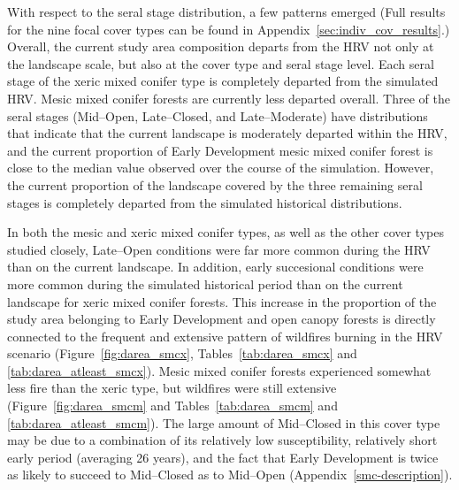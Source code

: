 With respect to the seral stage distribution, a few patterns emerged (Full results for the nine focal cover types can be found in Appendix~\ref{sec:indiv_cov_results}.) Overall, the current study area composition departs from the HRV not only at the landscape scale, but also at the cover type and seral stage level. Each seral stage of the xeric mixed conifer type is completely departed from the simulated HRV. Mesic mixed conifer forests are currently less departed overall. Three of the seral stages (Mid--Open, Late--Closed, and Late--Moderate) have distributions that indicate that the current landscape is moderately departed within the HRV, and the current proportion of Early Development mesic mixed conifer forest is close to the median value observed over the course of the simulation. However, the current proportion of the landscape covered by the three remaining seral stages is completely departed from the simulated historical distributions.

In both the mesic and xeric mixed conifer types, as well as the other cover types studied closely, Late--Open conditions were far more common during the HRV than on the current landscape. In addition, early succesional conditions were more common during the simulated historical period than on the current landscape for xeric mixed conifer forests. This increase in the proportion of the study area belonging to Early Development and open canopy forests is directly connected to the frequent and extensive pattern of wildfires burning in the HRV scenario (Figure~\ref{fig:darea_smcx}, Tables~\ref{tab:darea_smcx} and \ref{tab:darea_atleast_smcx}). Mesic mixed conifer forests experienced somewhat less fire than the xeric type, but wildfires were still extensive (Figure~\ref{fig:darea_smcm} and Tables~\ref{tab:darea_smcm} and \ref{tab:darea_atleast_smcm}). The large amount of Mid--Closed in this cover type may be due to a combination of its relatively low susceptibility, relatively short early period (averaging 26 years), and the fact that Early Development is twice as likely to succeed to Mid--Closed as to Mid--Open (Appendix~\ref{smc-description}).



